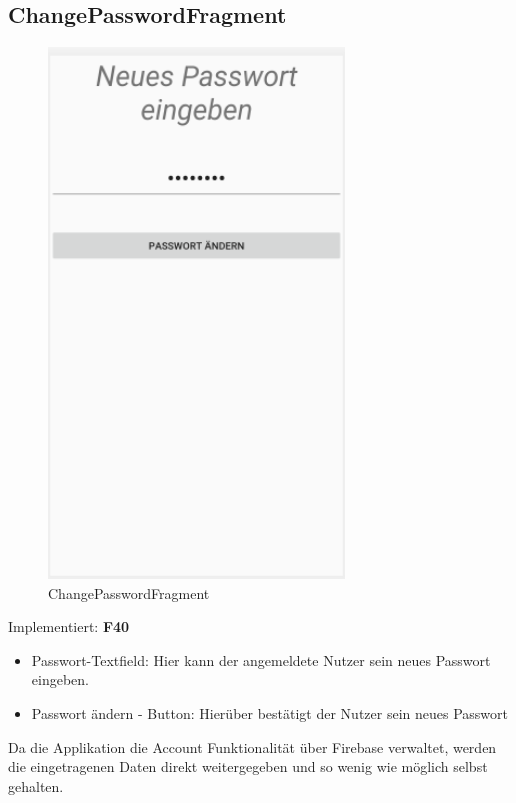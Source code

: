 \subsection{ChangePasswordFragment}
\begin{figure}[H]
	\centering
	\includegraphics[width=0.7\textwidth]{pics/change_password_fragment.png}%
	\caption{ChangePasswordFragment}%
	\label{view}%
\end{figure}
Implementiert: \textbf{F40}
\begin{itemize}[nosep]
	\item Passwort-Textfield: Hier kann der angemeldete Nutzer sein neues Passwort eingeben.
	\item Passwort ändern - Button: Hierüber bestätigt der Nutzer sein neues Passwort
	
\end{itemize}
Da die Applikation die Account Funktionalität über Firebase verwaltet, werden die eingetragenen Daten direkt weitergegeben und so wenig wie möglich selbst gehalten. 


